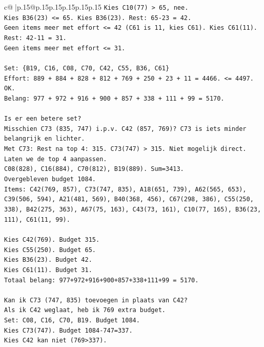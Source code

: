 \documentclass{article}
\begin{document}
{\begin{supertabular}{c@{$\;$}|p{.15\linewidth}@{}p{.15\linewidth}p{.15\linewidth}p{.15\linewidth}p{.15\linewidth}p{.15\linewidth}}
{{{\texttt{Kies C10(77) > 65, nee.} \\
\texttt{Kies B36(23) <= 65. Kies B36(23). Rest: 65{-}23 = 42.} \\
\texttt{Geen items meer met effort <= 42 (C61 is 11, kies C61). Kies C61(11). Rest: 42{-}11 = 31.} \\
\texttt{Geen items meer met effort <= 31.} \\
\\ 
\texttt{Set: \{B19, C16, C08, C70, C42, C55, B36, C61\}} \\
\texttt{Effort: 889 + 884 + 828 + 812 + 769 + 250 + 23 + 11 = 4466. <= 4497. OK.} \\
\texttt{Belang: 977 + 972 + 916 + 900 + 857 + 338 + 111 + 99 = 5170.} \\
\\ 
\texttt{Is er een betere set?} \\
\texttt{Misschien C73 (835, 747) i.p.v. C42 (857, 769)? C73 is iets minder belangrijk en lichter.} \\
\texttt{Met C73: Rest na top 4: 315. C73(747) > 315. Niet mogelijk direct.} \\
\texttt{Laten we de top 4 aanpassen.} \\
\texttt{C08(828), C16(884), C70(812), B19(889). Sum=3413.} \\
\texttt{Overgebleven budget 1084.} \\
\texttt{Items: C42(769, 857), C73(747, 835), A18(651, 739), A62(565, 653), C39(506, 594), A21(481, 569), B40(368, 456), C67(298, 386), C55(250, 338), B42(275, 363), A67(75, 163), C43(73, 161), C10(77, 165), B36(23, 111), C61(11, 99).} \\
\\ 
\texttt{Kies C42(769). Budget 315.} \\
\texttt{Kies C55(250). Budget 65.} \\
\texttt{Kies B36(23). Budget 42.} \\
\texttt{Kies C61(11). Budget 31.} \\
\texttt{Totaal belang: 977+972+916+900+857+338+111+99 = 5170.} \\
\\ 
\texttt{Kan ik C73 (747, 835) toevoegen in plaats van C42?} \\
\texttt{Als ik C42 weglaat, heb ik 769 extra budget.} \\
\texttt{Set: C08, C16, C70, B19. Budget 1084.} \\
\texttt{Kies C73(747). Budget 1084{-}747=337.} \\
\texttt{Kies C42 kan niet (769>337).} \\
}}}
\end{supertabular}}
\end{document}
